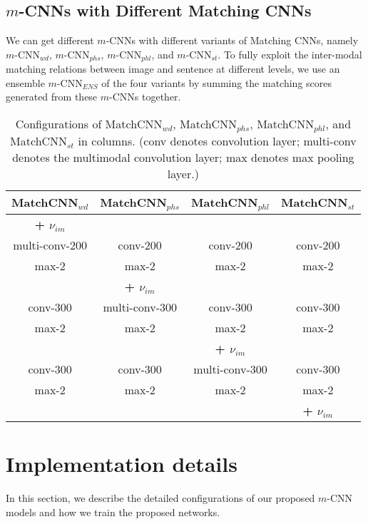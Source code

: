 \documentclass[10pt,twocolumn,letterpaper]{article}
\begin{document}
\subsection{$m$-CNNs with Different Matching CNNs}


We can get different $m$-CNNs with different variants of Matching CNNs, namely $m$-CNN$_{wd}$, $m$-CNN$_{phs}$, $m$-CNN$_{phl}$, and $m$-CNN$_{st}$. To fully exploit the inter-modal matching relations between image and sentence at different levels, we use an ensemble $m$-CNN$_{ENS}$ of the four variants  by summing the matching scores generated from these $m$-CNNs together.




\begin{table}\footnotesize
\begin{center}
\begin{tabular}{|c|c|c|c|}
\hline
MatchCNN$_{wd}$&MatchCNN$_{phs}$&MatchCNN$_{phl}$&MatchCNN$_{st}$\\
\hline\hline
\textbf{+ $\nu_{im}$}& & & \\
\hline\hline
multi-conv-200&conv-200&conv-200&conv-200\\
\hline\hline
max-2 &max-2 &max-2&max-2 \\
\hline\hline
& \textbf{+ $\nu_{im}$}&& \\
\hline\hline
conv-300 &multi-conv-300 &conv-300&conv-300 \\
\hline\hline
max-2 &max-2&max-2&max-2 \\
\hline\hline
& & \textbf{+ $\nu_{im}$}& \\
\hline\hline
conv-300&conv-300&multi-conv-300&conv-300 \\
\hline\hline
max-2&max-2&max-2&max-2 \\
\hline\hline
&&&\textbf{+ $\nu_{im}$} \\
\hline
\end{tabular}
\end{center}
\caption{Configurations of MatchCNN$_{wd}$, MatchCNN$_{phs}$, MatchCNN$_{phl}$, and MatchCNN$_{st}$ in columns. (conv denotes convolution layer; multi-conv denotes the multimodal convolution layer; max denotes max pooling layer.)}
\label{table:configuration}
\end{table}



\section{Implementation details}
In this section, we describe the detailed configurations of our proposed $m$-CNN models and how we train the proposed networks.
\end{document}
